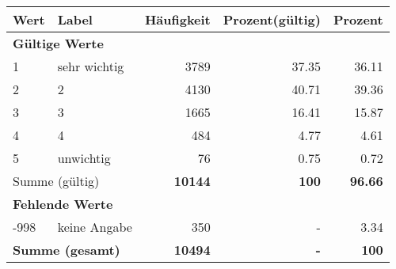      \begin{longtable}{lXrrr}
     \toprule
     \textbf{Wert} & \textbf{Label} & \textbf{Häufigkeit} & \textbf{Prozent(gültig)} & \textbf{Prozent} \\
     \endhead
     \midrule
     \multicolumn{5}{l}{\textbf{Gültige Werte}}\\

     1 &
     \multicolumn{1}{X}{ sehr wichtig   } &


       \num{3789} &
       \num[round-mode=places,round-precision=2]{37,35} &
         \num[round-mode=places,round-precision=2]{36,11} \\

     2 &
     \multicolumn{1}{X}{ 2   } &


       \num{4130} &
       \num[round-mode=places,round-precision=2]{40,71} &
         \num[round-mode=places,round-precision=2]{39,36} \\

     3 &
     \multicolumn{1}{X}{ 3   } &


       \num{1665} &
       \num[round-mode=places,round-precision=2]{16,41} &
         \num[round-mode=places,round-precision=2]{15,87} \\

     4 &
     \multicolumn{1}{X}{ 4   } &


       \num{484} &
       \num[round-mode=places,round-precision=2]{4,77} &
         \num[round-mode=places,round-precision=2]{4,61} \\

     5 &
     \multicolumn{1}{X}{ unwichtig   } &


       \num{76} &
       \num[round-mode=places,round-precision=2]{0,75} &
         \num[round-mode=places,round-precision=2]{0,72} \\
     \midrule
     \multicolumn{2}{l}{Summe (gültig)} &
       \textbf{\num{10144}} &
     \textbf{100} &
       \textbf{\num[round-mode=places,round-precision=2]{96,66}} \\
     \multicolumn{5}{l}{\textbf{Fehlende Werte}}\\
       -998 &
       keine Angabe &
         \num{350} &
        - &
         \num[round-mode=places,round-precision=2]{3,34} \\
     \midrule
     \multicolumn{2}{l}{\textbf{Summe (gesamt)}} &
          \textbf{\num{10494}} &
        \textbf{-} &
        \textbf{100} \\
     \bottomrule
     \end{longtable}
     
